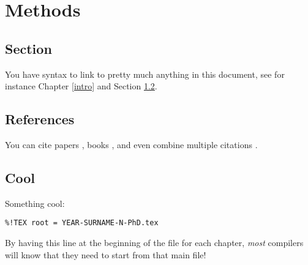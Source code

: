 
\chapter{Methods}\label{methods}

\section{Section}\label{methods-section}

You have syntax to link to pretty much anything in this document, see for instance Chapter \ref{intro} and Section \ref{methods-references}.

\section{References}\label{methods-references}

You can cite papers \cite{gasparini_2018}, books \cite{brent_1973}, and even combine multiple citations \cite{R, scopus}.

\section{Cool}\label{methods-cool}

Something cool:

\begin{verbatim}
%!TEX root = YEAR-SURNAME-N-PhD.tex
\end{verbatim}

By having this line at the beginning of the file for each chapter, \emph{most} compilers will know that they need to start from that main file!
